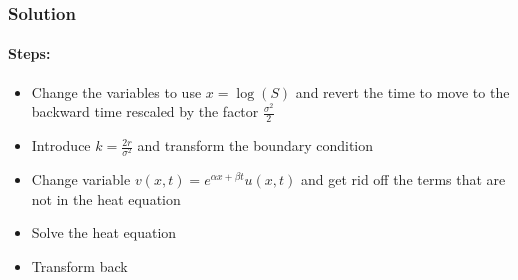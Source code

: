 \subsubsection{Solution}
\paragraph{Steps:}
\begin{itemize}
	\item Change the variables to use $x = \log(S)$ and revert the time to move to the backward time rescaled by the factor $\frac{\sigma^{2}}{2}$
	\item Introduce $k = \frac{2r}{\sigma ^{2}}$ and transform the boundary condition
	\item Change variable $v(x, t) = e^{\alpha x + \beta t}u(x, t)$ and get rid off the terms that are not in the heat equation
	\item Solve the heat equation
	\item Transform back
\end{itemize}

